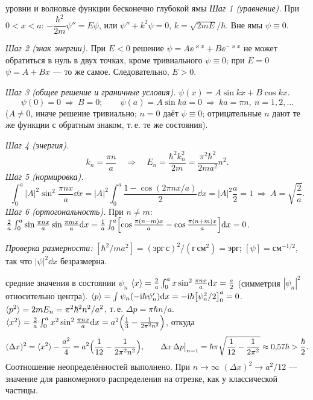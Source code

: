 \begin{derivation}[label=der:6:well]{уровни и волновые функции бесконечно глубокой ямы}
\emph{Шаг 1 (уравнение).} При $0<x<a$: $-\dfrac{\hbar^2}{2m}\psi''=E\psi$, или
$\psi''+k^2\psi=0$, $k=\sqrt{2mE}/\hbar$. Вне ямы $\psi\equiv0$.

\emph{Шаг 2 (знак энергии).} При $E<0$ решение $\psi=A\ee^{\varkappa x}+B\ee^{-\varkappa x}$ не может обратиться
в нуль в двух точках, кроме тривиального $\psi\equiv0$; при $E=0$ $\psi=A+Bx$ — то же самое.
Следовательно, $E>0$.

\emph{Шаг 3 (общее решение и граничные условия).} $\psi(x)=A\sin kx+B\cos kx$.
\[
  \psi(0)=0\ \Rightarrow\ B=0;\qquad \psi(a)=A\sin ka=0\ \Rightarrow\ ka=\pi n,\ n=1,2,\dots
\]
($A\neq0$, иначе решение тривиально; $n=0$ даёт $\psi\equiv0$; отрицательные $n$ дают те же
функции с обратным знаком, т.\,е. те же состояния).

\emph{Шаг 4 (энергия).}
\[
  k_n=\frac{\pi n}{a}\quad\Longrightarrow\quad E_n=\frac{\hbar^2k_n^2}{2m}=\frac{\pi^2\hbar^2}{2ma^2}n^2 .
\]
\emph{Шаг 5 (нормировка).}
\[
  \int_0^a|A|^2\sin^2\frac{\pi nx}{a}\dd x=|A|^2\int_0^a\frac{1-\cos(2\pi nx/a)}{2}\dd x=|A|^2\frac a2=1
  \ \Rightarrow\ A=\sqrt{\frac2a}.
\]
\emph{Шаг 6 (ортогональность).} При $n\neq m$:
$\frac2a\int_0^a\sin\frac{\pi nx}{a}\sin\frac{\pi mx}{a}\mathrm{d} x=\frac1a\int_0^a\Bigl[\cos\frac{\pi(n-m)x}{a}-\cos\frac{\pi(n+m)x}{a}\Bigr]\mathrm{d} x=0$.

\emph{Проверка размерности:} $[\hbar^2/ma^2]=(\text{эрг}\,\text{с})^2/(\text{г}\,\text{см}^2)=\text{эрг}$; $[\psi]=\text{см}^{-1/2}$,
так что $|\psi|^2\dd x$ безразмерна.
\end{derivation}

\begin{derivation}[label=der:6:means]{средние значения в состоянии $\psi_n$}
$\langle x\rangle=\frac2a\int_0^ax\sin^2\frac{\pi nx}{a}\mathrm{d} x=\frac a2$ (симметрия $|\psi_n|^2$ относительно центра).
$\langle p\rangle=\int\psi_n(-\mathrm{i}\hbar\psi_n')\mathrm{d} x=-\mathrm{i}\hbar\bigl[\psi_n^2/2\bigr]_0^a=0$.
$\langle p^2\rangle=2mE_n=\pi^2\hbar^2n^2/a^2$, т.\,е. $\Delta p=\pi\hbar n/a$.
$\langle x^2\rangle=\frac2a\int_0^ax^2\sin^2\frac{\pi nx}{a}\mathrm{d} x=a^2\Bigl(\frac13-\frac{1}{2\pi^2n^2}\Bigr)$, откуда
\[
  (\Delta x)^2=\langle x^2\rangle-\frac{a^2}{4}=a^2\Bigl(\frac{1}{12}-\frac{1}{2\pi^2n^2}\Bigr),\qquad
  \Delta x\,\Delta p\big|_{n=1}=\hbar\pi\sqrt{\frac1{12}-\frac1{2\pi^2}}\approx0{,}57\hbar>\frac\hbar2 .
\]
Соотношение неопределённостей выполнено. При $n\to\infty$ $(\Delta x)^2\to a^2/12$ — значение для
равномерного распределения на отрезке, как у классической частицы.
\end{derivation}

